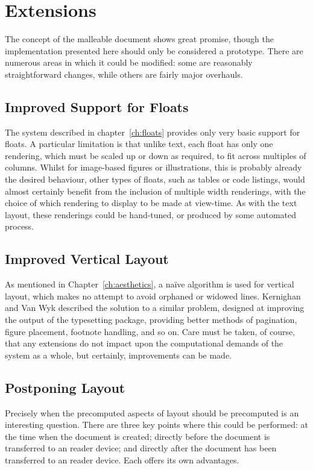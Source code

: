 

\section{Extensions}
The concept of the malleable document shows great promise, though the implementation presented here should only be considered a prototype. There are numerous areas in which it could be modified: some are reasonably straightforward changes, while others are fairly major overhauls.

\subsection{Improved Support for Floats}
The system described in chapter~\ref{ch:floats} provides only very basic support for floats. A particular limitation is that unlike text, each float has only one rendering, which must be scaled up or down as required, to fit across multiples of columns. Whilst for image-based figures or illustrations, this is probably already the desired behaviour, other types of floats, such as tables or code listings, would almost certainly benefit from the inclusion of multiple width renderings, with the choice of which rendering to display to be made at view-time. As with the text layout, these renderings could be hand-tuned, or produced by some automated process. 

\subsection{Improved Vertical Layout}
As mentioned in Chapter~\ref{ch:aesthetics}, a na\"ive algorithm is used for vertical layout, which makes no attempt to avoid orphaned or widowed lines. Kernighan and Van Wyk\hspace{0pt}\cite{Kernighan1989} described the solution to a similar problem, designed at improving the output of the \troff{} typesetting package, providing better methods of pagination, figure placement, footnote handling, and so on. Care must be taken, of course, that any extensions do not impact upon the computational demands of the system as a whole, but certainly, improvements can be made.


\subsection{Postponing Layout}
\label{sec:postponing}
Precisely when the precomputed aspects of layout should be precomputed is an interesting question. There are three key points where this could be performed: at the time when the document is created; directly before the document is transferred to an \ebook{} reader device; and directly after the document has been transferred to an \ebook{} reader device. Each offers its own advantages.

